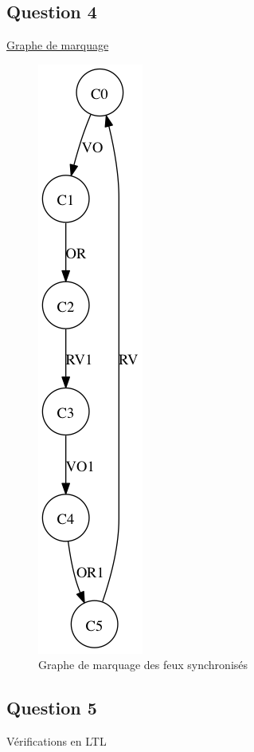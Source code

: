 \documentclass[11pt]{article}
\begin{document}
\subsection{Question 4}

\href{https://github.com/masters-info-nantes/hong-cheng-lv/blob/master/ressources/part1/Q4-GrapheMarquage.txt}{Graphe de marquage}

\begin{figure}[H]
	\centering
	\includegraphics[scale=0.5]{ressources/part1/traitement-question4/graphe.png}
	\caption{Graphe de marquage des feux synchronisés}
\end{figure}

\subsection{Question 5}
Vérifications en LTL
\end{document}
